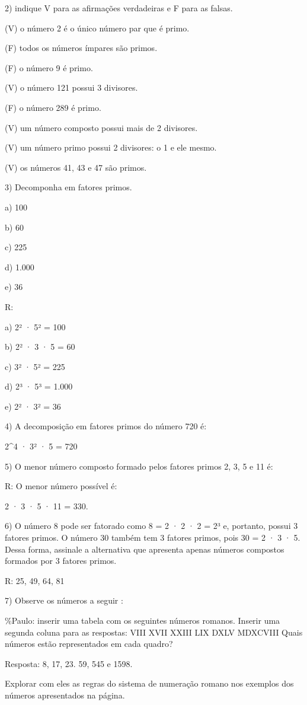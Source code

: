 2) indique V para as afirmações verdadeiras e F para as falsas.

(V) o número 2 é o único número par que é primo.

(F) todos os números ímpares são primos.

(F) o número 9 é primo.

(V) o número 121 possui 3 divisores.

(F) o número 289 é primo.

(V) um número composto possui mais de 2 divisores.

(V) um número primo possui 2 divisores: o 1 e ele mesmo.

(V) os números 41, 43 e 47 são primos.

3) Decomponha em fatores primos.

a) 100

b) 60

c) 225

d) 1.000

e) 36

R:

a) 2² · 5² = 100

b) 2² · 3 · 5 = 60

c) 3² · 5² = 225

d) 2³ · 5³ = 1.000

e) 2² · 3² = 36

4) A decomposição em fatores primos do número 720 é:

2\^{}4 · 3² · 5 = 720

5) O menor número composto formado pelos fatores primos 2, 3, 5 e 11 é:

R: O menor número possível é:

2 · 3 · 5 · 11 = 330.

6) O número 8 pode ser fatorado como 8 = 2 · 2 · 2 = 2³ e, portanto,
possui 3 fatores primos. O número 30 também tem 3 fatores primos, pois
30 = 2 · 3 · 5. Dessa forma, assinale a alternativa que apresenta apenas
números compostos formados por 3 fatores primos.

R: 25, 49, 64, 81

7) Observe os números a seguir :

\%Paulo: inserir uma tabela com os seguintes números romanos. Inserir
uma segunda coluna para as respostas: VIII XVII XXIII LIX DXLV MDXCVIII
Quais números estão representados em cada quadro?

Resposta: 8, 17, 23. 59, 545 e 1598.

Explorar com eles as regras do sistema de numeração romano nos exemplos
dos números apresentados na página.

